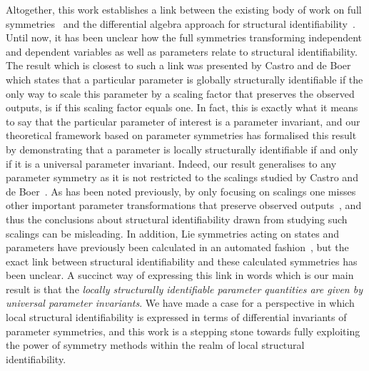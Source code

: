 \documentclass[12pt]{article}
\begin{document}
Altogether, this work establishes a link between the existing body of work on full symmetries~\cite{yates2009structural,merkt2015higher,massonis2020finding,castro2020structuralIdentifiability,villaverde2022symmetries} and the differential algebra approach for structural identifiability~\cite{ljung1994global,hong2020global,saccomani2001new,walter1982global}. Until now, it has been unclear how the full symmetries transforming independent and dependent variables as well as parameters relate to structural identifiability. The result which is closest to such a link was presented by Castro and de Boer~\cite{castro2020structuralIdentifiability} which states that a particular parameter is globally structurally identifiable if the only way to scale this parameter by a scaling factor that preserves the observed outputs, is if this scaling factor equals one. In fact, this is exactly what it means to say that the particular parameter of interest is a parameter invariant, and our theoretical framework based on parameter symmetries has formalised this result by demonstrating that a parameter is locally structurally identifiable if and only if it is a universal parameter invariant. Indeed, our result generalises to any parameter symmetry as it is not restricted to the scalings studied by Castro and de Boer~\cite{castro2020structuralIdentifiability}. As has been noted previously, by only focusing on scalings one misses other important parameter transformations that preserve observed outputs~\cite{villaverde2021testing}, and thus the conclusions about structural identifiability drawn from studying such scalings can be misleading. In addition, Lie symmetries acting on states and parameters have previously been calculated in an automated fashion~\cite{massonis2020finding}, but the exact link between structural identifiability and these calculated symmetries has been unclear. A succinct way of expressing this link in words which is our main result is that the \textit{locally structurally identifiable parameter quantities are given by universal parameter invariants}.  We have made a case for a perspective in which local structural identifiability is expressed in terms of differential invariants of parameter symmetries, and this work is a stepping stone towards fully exploiting the power of symmetry methods within the realm of local structural identifiability.



\end{document}
